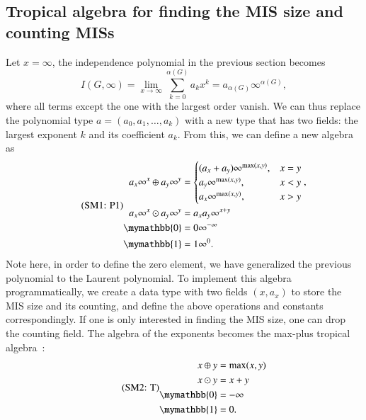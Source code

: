 \documentclass[onefignum, onetabnum]{siamart190516}
\newcommand{\eqname}[1]{\stepcounter{equation}\tag{\theequation : #1}}
\newcommand{\<}{\langle}
\renewcommand{\>}{\rangle}
\begin{document}
\subsection{Tropical algebra for finding the MIS size and counting MISs}
Let $x=\infty$, the independence polynomial in the previous section becomes
\begin{equation}
I(G, \infty) = \lim_{x\rightarrow \infty}\sum_{k=0}^{\alpha(G)}a_k x^k = a_{\alpha(G)} \infty^{\alpha(G)},
\end{equation}
where all terms except the one with the largest order vanish. We can thus replace the polynomial type $a = (a_0, a_1, \ldots, a_k)$ with a new type that has two fields: the largest exponent $k$ and its coefficient $a_k$.
From this, we can define a new algebra as
\begin{equation}
    \eqname{P1}
\begin{split}
    a_x\infty^x \oplus a_y\infty^y &= \begin{cases}
        (a_x + a_y)\infty^{\max(x,y)}, & x = y\\
        a_y\infty^{\max(x,y)}, & x < y\\
        a_x\infty^{\max(x,y)}, & x > y
    \end{cases}, \\
    a_x\infty^x \odot a_y\infty^y &= a_x a_y\infty^{x+y}\\
    \mymathbb{0} &= 0\infty^{-\infty}\\
    \mymathbb{1} &= 1\infty^{0}.
\end{split}%
\label{eq:countingtropical}
\end{equation}
Note here, in order to define the zero element, we have generalized the previous polynomial to the Laurent polynomial.
To implement this algebra programmatically, we create a data type with two fields $(x, a_x)$ to store the MIS size and its counting,
and define the above operations and constants correspondingly.
If one is only interested in finding the MIS size, one can drop the counting field.
The algebra of the exponents becomes the max-plus tropical algebra~\cite{Maclagan2015, Moore2011}:
\begin{equation}\eqname{T}
    \begin{split}
        x \oplus y &= \max(x,y)\\
        x \odot y &= x + y\\
        \mymathbb{0} &= -\infty\\
        \mymathbb{1} &= 0.
    \end{split}\label{eq:tropical}
\end{equation}
\end{document}
